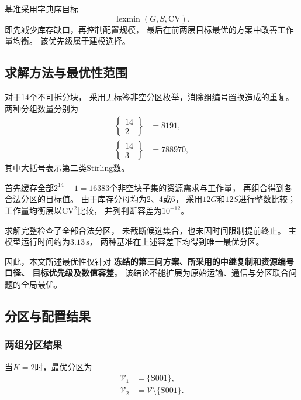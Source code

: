 \documentclass[bwprint]{gmcmthesis}
\begin{document}
基准采用字典序目标
\begin{equation}
\operatorname{lexmin}(G,S,\mathrm{CV}).
\end{equation}
即先减少库存缺口，再控制配置规模，
最后在前两层目标最优的方案中改善工作量均衡。
该优先级属于建模选择。

\subsection{求解方法与最优性范围}

对于14个不可拆分块，
采用无标签非空分区枚举，消除组编号置换造成的重复。
两种分组数量分别为
\begin{align}
\left\{\begin{matrix}14\\2\end{matrix}\right\}
&=8191,\\
\left\{\begin{matrix}14\\3\end{matrix}\right\}
&=788970,
\end{align}
其中大括号表示第二类Stirling数。

首先缓存全部$2^{14}-1=16383$个非空块子集的资源需求与工作量，
再组合得到各合法分区的目标值。
由于库存分母均为2、4或6，
采用$12G$和$12S$进行整数比较；
工作量均衡层以$\mathrm{CV}^2$比较，
并列判断容差为$10^{-12}$。

求解完整检查了全部合法分区，
未截断候选集合，也未因时间限制提前终止。
主模型运行时间约为$3.13\,\mathrm{s}$，
两种基准在上述容差下均得到唯一最优分区。

因此，本文所述最优性仅针对
\textbf{冻结的第三问方案、所采用的中继复制和资源编号口径、
目标优先级及数值容差}。
该结论不能扩展为原始运输、通信与分区联合问题的全局最优。

\subsection{分区与配置结果}

\subsubsection{两组分区结果}

当$K=2$时，最优分区为
\begin{align}
\mathcal{V}_1&=\{\mathrm{S001}\},\\
\mathcal{V}_2&=\mathcal{V}\setminus\{\mathrm{S001}\}.
\end{align}
\end{document}
